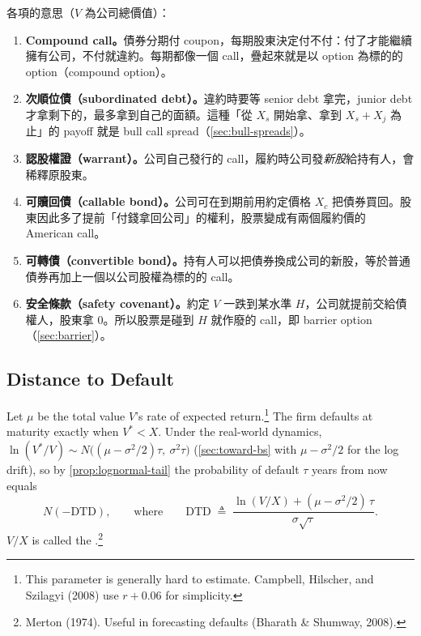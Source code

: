 \suppstart
{}

\begin{remark}
	各項的意思（$V$ 為公司總價值）：
	\begin{enumerate}[(1),nosep]
		\item \textbf{Compound call。}債券分期付 coupon，每期股東決定付不付：付了才能繼續擁有公司，不付就違約。每期都像一個 call，疊起來就是以 option 為標的的 option（compound option）。
		\item \textbf{次順位債（subordinated debt）。}違約時要等 senior debt 拿完，junior debt 才拿剩下的，最多拿到自己的面額。這種「從 $X_{s}$ 開始拿、拿到 $X_{s}+X_{j}$ 為止」的 payoff 就是 bull call spread（\autoref{sec:bull-spreads}）。
		\item \textbf{認股權證（warrant）。}公司自己發行的 call，履約時公司發\emph{新股}給持有人，會稀釋原股東。
		\item \textbf{可贖回債（callable bond）。}公司可在到期前用約定價格 $X_{c}$ 把債券買回。股東因此多了提前「付錢拿回公司」的權利，股票變成有兩個履約價的 American call。
		\item \textbf{可轉債（convertible bond）。}持有人可以把債券換成公司的新股，等於普通債券再加上一個以公司股權為標的的 call。
		\item \textbf{安全條款（safety covenant）。}約定 $V$ 一跌到某水準 $H$，公司就提前交給債權人，股東拿 $0$。所以股票是碰到 $H$ 就作廢的 call，即 barrier option（\autoref{sec:barrier}）。
	\end{enumerate}
\end{remark}
\suppend

\subsection{Distance to Default}


Let $\mu$ be the total value $V$'s rate of expected return.\footnote{This parameter is generally hard to estimate. Campbell, Hilscher, and Szilagyi (2008) use $r+0.06$ for simplicity.}
\suppstart
The firm defaults at maturity exactly when $V^{*}<X$.
Under the real-world dynamics, $\ln(V^{*}/V)\sim N\bigl((\mu-\sigma^{2}/2)\tau,\ \sigma^{2}\tau\bigr)$ (\autoref{sec:toward-bs} with $\mu-\sigma^{2}/2$ for the log drift), so by \autoref{prop:lognormal-tail} the probability of default $\tau$ years from now equals
\suppend
\[
	N(-\mathrm{DTD}) ,
	\qquad\text{where}\qquad
	\mathrm{DTD} \;\triangleq\; \frac{\ln(V/X)+(\mu-\sigma^{2}/2)\,\tau}{\sigma\sqrt{\tau}} .
\]
$V/X$ is called the .\footnote{Merton (1974). Useful in forecasting defaults (Bharath \& Shumway, 2008).}

